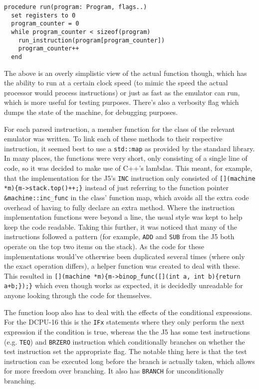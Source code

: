 \begin{lstlisting}[caption={Running a DCPU-16 program}]
procedure run(program: Program, flags..)
  set registers to 0
  program_counter = 0
  while program_counter < sizeof(program)
    run_instruction(program[program_counter])
    program_counter++
  end
\end{lstlisting}

The above is an overly simplistic view of the actual function though, which has
the ability to run at a certain clock speed (to mimic the speed the actual
processor would process instructions) or just as fast as the emulator can run,
which is more useful for testing purposes. There's also a verbosity flag which
dumps the state of the machine, for debugging purposes.

For each parsed instruction, a member function for the class of the relevant
emulator was written. To link each of these methods to their respective
instruction, it seemed best to use a \texttt{std::map} as provided by the
standard library. In many places, the functions were very short, only consisting
of a single line of code, so it was decided to make use of C++'s lambdas. This
meant, for example, that the implementation for the J5's \texttt{INC}
instruction only consisted of
\verb|[](machine *m){m->stack.top()++;}| instead of just referring to the
function pointer \verb|&machine::inc_func| in the class' function map, which
avoids all the extra code overhead of having to fully declare an extra method.
Where the instruction implementation functions were beyond a line, the usual
style was kept to help keep the code readable. Taking this further, it was
noticed that many of the instructions followed a pattern (for example,
\texttt{ADD} and \texttt{SUB} from the J5 both operate on the top two items on
the stack). As the code for these implementations would've otherwise been
duplicated several times (where only the exact operation differs), a helper
function was created to deal with these. This resulted in
\verb|[](machine *m){m->binop_func([](int a, int b){return a+b;});}| which even
though works as expected, it is decidedly unreadable for anyone looking through
the code for themselves.

The function loop also has to deal with the effects of the conditional
expressions. For the DCPU-16 this is the \lstinline{IFx} statements where they
only perform the next expression if the condition is true, whereas the the J5
has some test instructions (e.g. \lstinline{TEQ}) and \lstinline{BRZERO}
instruction which conditionally branches on whether the test instruction set the
appropriate flag. The notable thing here is that the test instruction can be
executed long before the branch is actually taken, which allows for more freedom
over branching. It also has \lstinline{BRANCH} for unconditionally branching.

